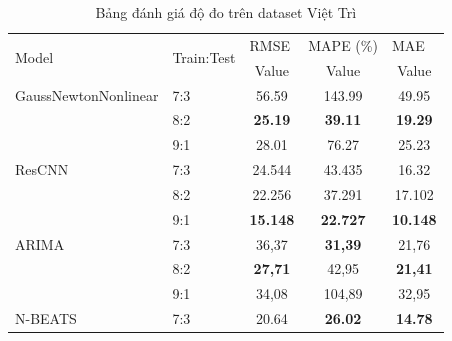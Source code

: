 \documentclass[conference]{IEEEtran}
\begin{document}
\begin{table}[ht]
    \centering
    \caption{Bảng đánh giá độ đo trên dataset Việt Trì}
    \begin{tabular}{|l|l|c|c|c|}
        \hline
        \multirow{2}{*}{Model} & \multirow{2}{*}{Train:Test} & \multicolumn{1}{l|}{RMSE} & \multicolumn{1}{l|}{MAPE (\%)} & \multicolumn{1}{l|}{MAE} \\ \cline{3-5}
                               &                             & Value                     & Value                          & Value                    \\ \hline
        GaussNewtonNonlinear   & 7:3                         & 56.59                     & 143.99                         & 49.95                    \\ \cline{2-5}
                               & 8:2                         & \textbf{25.19}            & \textbf{39.11}                 & \textbf{19.29}           \\ \cline{2-5}
                               & 9:1                         & 28.01                     & 76.27                          & 25.23                    \\ \hline
        ResCNN                 & 7:3                         & 24.544                    & 43.435                         & 16.32                    \\ \cline{2-5}
                               & 8:2                         & 22.256                    & 37.291                         & 17.102                   \\ \cline{2-5}
                               & 9:1                         & \textbf{15.148}           & \textbf{22.727}                & \textbf{10.148}          \\ \hline
        ARIMA                  & 7:3                         & 36,37                     & \textbf{31,39}                 & 21,76                    \\ \cline{2-5}
                               & 8:2                         & \textbf{27,71}            & 42,95                          & \textbf{21,41}           \\ \cline{2-5}
                               & 9:1                         & 34,08                     & 104,89                         & 32,95                    \\ \hline
        N-BEATS                & 7:3                         & 20.64                     & \textbf{26.02}                 & \textbf{14.78}           \\ \cline{2-5}

\end{tabular}
\end{table}
\end{document}
